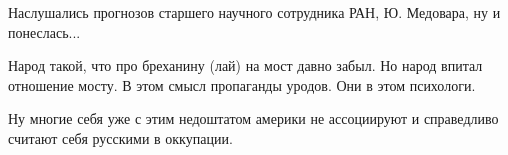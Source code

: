 \begin{itemize}
Наслушались прогнозов старшего научного сотрудника РАН, Ю. Медовара, ну и понеслась...


Народ такой, что про бреханину (лай) на мост давно забыл. Но народ впитал
отношение мосту. В этом смысл пропаганды уродов. Они в этом психологи.


Ну многие себя уже с этим недоштатом америки не ассоциируют и справедливо считают себя русскими в оккупации.

\end{itemize} %
